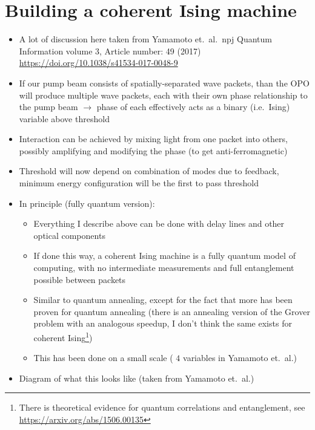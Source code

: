 \documentclass[english]{article}
\begin{document}
\section{Building a coherent Ising machine}
\begin{itemize}
\item A lot of discussion here taken from Yamamoto et.~al.~npj Quantum Information volume 3, Article number: 49 (2017) \href{https://doi.org/10.1038/s41534-017-0048-9}{https://doi.org/10.1038/s41534-017-0048-9}
\item If our pump beam consists of spatially-separated wave packets, than the OPO will produce multiple wave packets, each with their own phase relationship to the pump beam $\rightarrow$ phase of each effectively acts as a binary (i.e.~Ising) variable above threshold
\item Interaction can be achieved by mixing light from one packet into others, possibly amplifying and modifying the phase (to get anti-ferromagnetic)
\item Threshold will now depend on combination of modes due to feedback, minimum energy configuration will be the first to pass threshold 
\item In principle (fully quantum version):
\begin{itemize}
\item Everything I describe above can be done with delay lines and other optical components
\item If done this way, a coherent Ising machine is a fully quantum model of computing, with no intermediate measurements and full entanglement possible between packets
\item Similar to quantum annealing, except for the fact that more has been proven for quantum annealing (there is an annealing version of the Grover problem with an analogous speedup, I don't think the same exists for coherent Ising\footnote{There is theoretical evidence for quantum correlations and entanglement, see \href{https://arxiv.org/abs/1506.00135}{https://arxiv.org/abs/1506.00135}})
\item This has been done on a small scale ( $4$ variables in Yamamoto et.~al.)
\end{itemize}
\item Diagram of what this looks like (taken from Yamamoto et.~al.)


\end{itemize}
\end{document}
